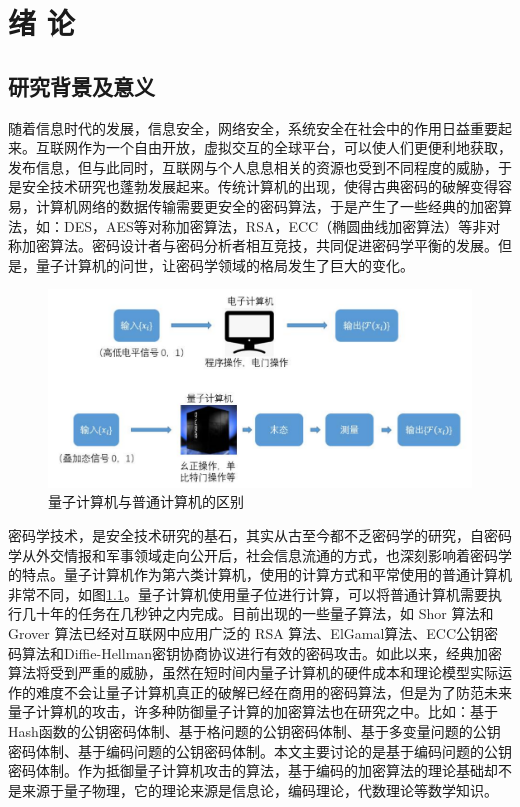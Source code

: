 \chapter{绪\hskip 0.4cm 论}
\label{chap1}

\section{研究背景及意义}
随着信息时代的发展，信息安全，网络安全，系统安全在社会中的作用日益重要起来。互联网作为一个自由开放，虚拟交互的全球平台，可以使人们更便利地获取，发布信息，但与此同时，互联网与个人息息相关的资源也受到不同程度的威胁，于是安全技术研究也蓬勃发展起来。传统计算机的出现，使得古典密码的破解变得容易，计算机网络的数据传输需要更安全的密码算法，于是产生了一些经典的加密算法，如：DES，AES等对称加密算法，RSA，ECC（椭圆曲线加密算法）等非对称加密算法。密码设计者与密码分析者相互竞技，共同促进密码学平衡的发展。但是，量子计算机的问世，让密码学领域的格局发生了巨大的变化。

\begin{figure}[H]
	\centering
	\includegraphics[width=15 cm]{fig/quantum.pdf}
	\caption{量子计算机与普通计算机的区别} %
	\label{fig:quantum_pdf}
\end{figure}

密码学技术，是安全技术研究的基石，其实从古至今都不乏密码学的研究，自密码学从外交情报和军事领域走向公开后，社会信息流通的方式，也深刻影响着密码学的特点。量子计算机作为第六类计算机，使用的计算方式和平常使用的普通计算机非常不同，如图\ref{fig:quantum_pdf}。量子计算机使用量子位进行计算，可以将普通计算机需要执行几十年的任务在几秒钟之内完成。目前出现的一些量子算法，如 Shor 算法\cite{Shor1994Algorithms}和 Grover 算法\cite{Grover1996Fast}已经对互联网中应用广泛的 RSA 算法、ElGamal算法、ECC公钥密码算法和Diffie-Hellman密钥协商协议进行有效的密码攻击。如此以来，经典加密算法将受到严重的威胁，虽然在短时间内量子计算机的硬件成本和理论模型实际运作的难度不会让量子计算机真正的破解已经在商用的密码算法，但是为了防范未来量子计算机的攻击，许多种防御量子计算的加密算法也在研究之中。比如：基于Hash函数的公钥密码体制、基于格问题的公钥密码体制、基于多变量问题的公钥密码体制、基于编码问题的公钥密码体制。本文主要讨论的是基于编码问题的公钥密码体制。作为抵御量子计算机攻击的算法，基于编码的加密算法的理论基础却不是来源于量子物理，它的理论来源是信息论，编码理论，代数理论等数学知识。

